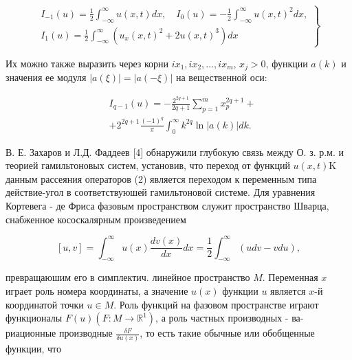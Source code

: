 \documentclass[10pt]{article}
\begin{document}
\[

\left.\begin{array}{c}

I_{-1}(u)=\frac{1}{2} \int_{-\infty}^{\infty} u(x, t) d x, \quad I_{0}(u)=-\frac{1}{2} \int_{-\infty}^{\infty} u(x, t)^{2} d x, \\

I_{1}(u)=\frac{1}{2} \int_{-\infty}^{\infty}\left(u_{x}(x, t)^{2}+2 u(x, t)^{3}\right) d x

\end{array}\right\}

\]



Их можно также выразить через корни $i x_{1}, i x_{2}, \ldots, i x_{m}$, $x_{j}>0$, функции $a(k)$ и значения ее модуля $|a(\xi)|=|a(-\xi)|$ на вещественной оси:



\[

\begin{aligned}

& I_{q-1}(u)=-\frac{2^{2 q+1}}{2 q+1} \sum_{p=1}^{m} x_{p}^{2 q+1}+ \\

& +2^{2 q+1} \frac{(-1)^{q}}{\pi} \int_{0}^{\infty} k^{2 q} \ln |a(k)| d k .

\end{aligned}

\]



В. Е. Захаров и Л.Д. Фаддеев [4] обнаружили глубокую связь между О. з. р.м. и теорией гамильтоновых систем, установив, что переход от функций $u(x, t) \mathrm{K}$ данным рассеяния операторов (2) является переходом к переменным типа действие-угол в соответствуюшей гамильтоновой системе. Для уравнения Кортевега - де Фриса фазовым пространством служит пространство Шварца, снабженное кососкалярным произведением



\[

[u, v]=\int_{-\infty}^{\infty} u(x) \frac{d v(x)}{d x} d x=\frac{1}{2} \int_{-\infty}^{\infty}(u d v-v d u),

\]



превращаюшим его в симплектич. линейное пространство $M$. Переменная $x$ играет роль номера координаты, а значение $u(x)$ функции $u$ является $x$-й координатой точки $u \in M$. Роль функций на фазовом пространстве играют функционалы $F(u)\left(F: M \rightarrow \mathbb{R}^{1}\right)$, а роль частных производных - ва- риационные производные $\frac{\delta F}{\delta u(x)}$, то есть такие обычные или обобщенные функции, что
\end{document}
